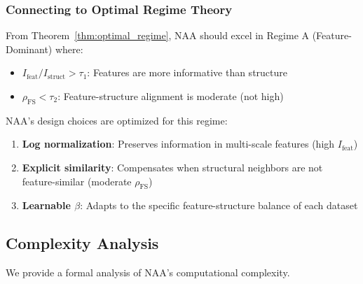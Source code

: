 \subsubsection{Connecting to Optimal Regime Theory}

From Theorem~\ref{thm:optimal_regime}, NAA should excel in Regime A (Feature-Dominant) where:
\begin{itemize}
    \item $I_{\text{feat}} / I_{\text{struct}} > \tau_1$: Features are more informative than structure
    \item $\rho_{\text{FS}} < \tau_2$: Feature-structure alignment is moderate (not high)
\end{itemize}

NAA's design choices are optimized for this regime:
\begin{enumerate}
    \item \textbf{Log normalization}: Preserves information in multi-scale features (high $I_{\text{feat}}$)
    \item \textbf{Explicit similarity}: Compensates when structural neighbors are not feature-similar (moderate $\rho_{\text{FS}}$)
    \item \textbf{Learnable $\beta$}: Adapts to the specific feature-structure balance of each dataset
\end{enumerate}

\subsection{Complexity Analysis}
\label{sec:complexity}

We provide a formal analysis of NAA's computational complexity.

